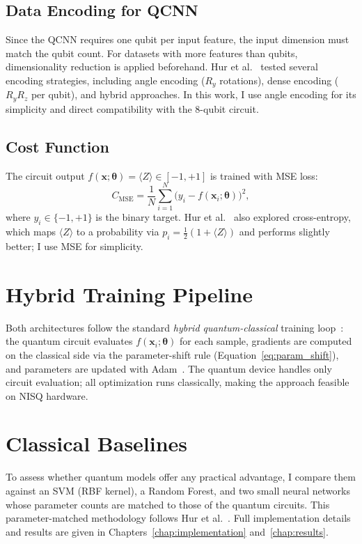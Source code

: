 \subsection{Data Encoding for QCNN}

Since the QCNN requires one qubit per input feature, the input dimension must match the qubit count. For datasets with more features than qubits, dimensionality reduction is applied beforehand. Hur et al.~\cite{hur2022quantum} tested several encoding strategies, including angle encoding ($R_y$ rotations), dense encoding ($R_y R_z$ per qubit), and hybrid approaches. In this work, I use angle encoding for its simplicity and direct compatibility with the 8-qubit circuit.

\subsection{Cost Function}
\label{subsec:qcnn_cost}

The circuit output $f(\mathbf{x}; \boldsymbol{\theta}) = \langle Z \rangle \in [-1, +1]$ is trained with MSE loss:
\begin{equation}
    C_{\text{MSE}} = \frac{1}{N}\sum_{i=1}^{N} \big(y_i - f(\mathbf{x}_i; \boldsymbol{\theta})\big)^2,
    \label{eq:mse}
\end{equation}
where $y_i \in \{-1, +1\}$ is the binary target. Hur et al.~\cite{hur2022quantum} also explored cross-entropy, which maps $\langle Z \rangle$ to a probability via $p_i = \tfrac{1}{2}(1 + \langle Z \rangle)$ and performs slightly better; I use MSE for simplicity.


\section{Hybrid Training Pipeline}
\label{sec:training}

Both architectures follow the standard \emph{hybrid quantum-classical} training loop~\cite{cerezo2021variational}: the quantum circuit evaluates $f(\mathbf{x}_i;\boldsymbol{\theta})$ for each sample, gradients are computed on the classical side via the parameter-shift rule (Equation~\ref{eq:param_shift}), and parameters are updated with Adam~\cite{kingma2015adam}. The quantum device handles only circuit evaluation; all optimization runs classically, making the approach feasible on NISQ hardware.
\section{Classical Baselines}
\label{sec:baselines}

To assess whether quantum models offer any practical advantage, I compare them against an SVM (RBF kernel), a Random Forest, and two small neural networks whose parameter counts are matched to those of the quantum circuits. This parameter-matched methodology follows Hur et al.~\cite{hur2022quantum}. Full implementation details and results are given in Chapters~\ref{chap:implementation} and~\ref{chap:results}.
